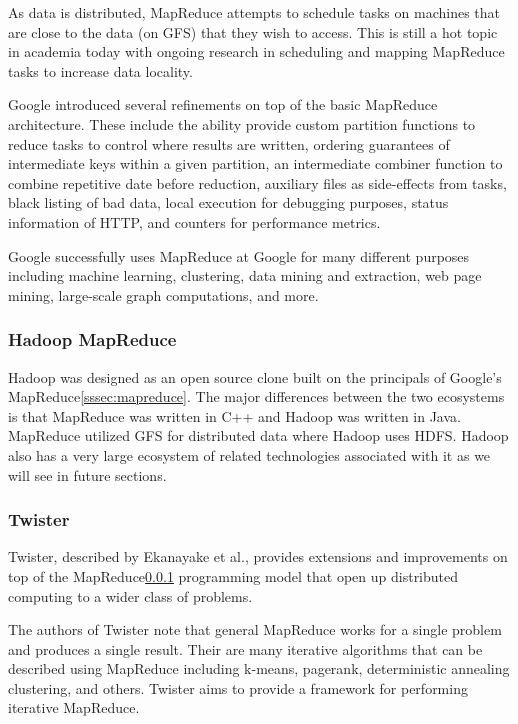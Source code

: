 \documentclass[]{article}
\begin{document}
As data is distributed, MapReduce attempts to schedule tasks on machines that are close to the data (on GFS) that they wish to access. This is still a hot topic in academia today with ongoing research in scheduling and mapping MapReduce tasks to increase data locality.

Google introduced several refinements on top of the basic MapReduce architecture. These include the ability provide custom partition functions to reduce tasks to control where results are written, ordering guarantees of intermediate keys within a given partition, an intermediate combiner function to combine repetitive date before reduction, auxiliary files as side-effects from tasks, black listing of bad data, local execution for debugging purposes, status information of HTTP, and counters for performance metrics.

Google successfully uses MapReduce at Google for many different purposes including machine learning, clustering, data mining and extraction, web page mining, large-scale graph computations, and more.

\subsubsection{Hadoop MapReduce}\label{sssec:hadoop-mapreduce}
Hadoop\cite{white2012hadoop} was designed as an open source clone built on the principals of Google's MapReduce\ref{sssec:mapreduce}. The major differences between the two ecosystems is that MapReduce was written in C++ and Hadoop was written in Java. MapReduce utilized GFS for distributed data where Hadoop uses HDFS. Hadoop also has a very large ecosystem of related technologies associated with it as we will see in future sections. 

\subsubsection{Twister}\label{sssec:twister}
Twister, described by Ekanayake et al.\cite{ekanayake2010twister}, provides extensions and improvements on top of the MapReduce\ref{sssec:hadoop-mapreduce} programming model that open up distributed computing to a wider class of problems. 

The authors of Twister note that general MapReduce works for a single problem and produces a single result. Their are many iterative algorithms that can be described using MapReduce including k-means, pagerank, deterministic annealing clustering, and others. Twister aims to provide a framework for performing iterative MapReduce.
\end{document}
